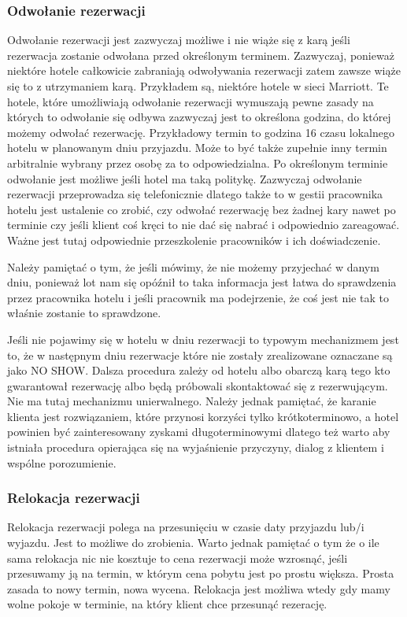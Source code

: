 \documentclass[12pt, a4paper]{article}
\begin{document}
\subsubsection{Odwołanie rezerwacji}
Odwołanie rezerwacji jest zazwyczaj możliwe i nie wiąże się z karą jeśli 
rezerwacja zostanie odwołana przed określonym terminem. Zazwyczaj, ponieważ
niektóre hotele całkowicie zabraniają odwoływania rezerwacji zatem zawsze wiąże
się to z utrzymaniem karą. Przykładem są, niektóre hotele w sieci Marriott.
Te hotele, które umożliwiają odwołanie rezerwacji wymuszają pewne
zasady na których to odwołanie się odbywa zazwyczaj jest to określona godzina,
do której możemy odwołać rezerwację. Przykładowy termin to godzina 16 czasu
lokalnego hotelu w planowanym dniu przyjazdu. Może to być także zupełnie inny termin arbitralnie wybrany przez osobę za to odpowiedzialna. 
  Po określonym terminie odwołanie jest możliwe jeśli hotel ma taką politykę. 
  Zazwyczaj odwołanie rezerwacji przeprowadza się telefonicznie dlatego także to w gestii 
  pracownika hotelu jest ustalenie co zrobić, czy odwołać rezerwację bez żadnej kary nawet po terminie
   czy jeśli klient coś kręci to nie dać się nabrać i odpowiednio zareagować. 
  Ważne jest tutaj odpowiednie przeszkolenie pracowników i ich doświadczenie.
  
  Należy pamiętać o tym, że jeśli mówimy, że nie możemy przyjechać w danym dniu,
  ponieważ lot nam się opóźnił to taka informacja jest łatwa do sprawdzenia
  przez pracownika hotelu i jeśli pracownik ma podejrzenie, że coś jest nie tak
  to właśnie zostanie to sprawdzone.

Jeśli nie pojawimy się w hotelu w dniu rezerwacji to typowym mechanizmem jest
to, że w następnym dniu rezerwacje które nie zostały zrealizowane oznaczane są
jako NO SHOW. Dalsza procedura zależy od hotelu albo obarczą karą tego kto
gwarantował rezerwację albo będą próbowali skontaktować się z rezerwującym. Nie
ma tutaj mechanizmu unierwalnego. Należy jednak pamiętać, że karanie klienta
jest rozwiązaniem, które przynosi korzyści tylko krótkoterminowo, a hotel
powinien być zainteresowany zyskami długoterminowymi dlatego też warto aby
istniała procedura opierająca się na wyjaśnienie przyczyny, dialog z klientem i
wspólne porozumienie.

\subsubsection{Relokacja rezerwacji}
Relokacja rezerwacji polega na przesunięciu w czasie daty 
przyjazdu lub/i wyjazdu. Jest to możliwe do zrobienia. Warto jednak pamiętać o
tym że o ile sama relokacja nic nie kosztuje to cena rezerwacji może 
wzrosnąć, jeśli przesuwamy ją na termin, w którym cena pobytu jest po prostu 
większa. Prosta zasada to nowy termin, nowa wycena. Relokacja jest możliwa 
wtedy gdy mamy wolne pokoje w terminie, na który klient chce przesunąć
rezerację.
\end{document}
